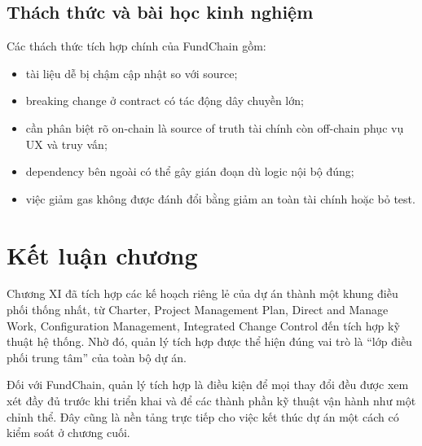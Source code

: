 \subsection{Thách thức và bài học kinh nghiệm}

Các thách thức tích hợp chính của FundChain gồm:

\begin{itemize}
  \item tài liệu dễ bị chậm cập nhật so với source;
  \item breaking change ở contract có tác động dây chuyền lớn;
  \item cần phân biệt rõ on-chain là source of truth tài chính còn off-chain phục vụ UX và truy vấn;
  \item dependency bên ngoài có thể gây gián đoạn dù logic nội bộ đúng;
  \item việc giảm gas không được đánh đổi bằng giảm an toàn tài chính hoặc bỏ test.
\end{itemize}

\fi
\section{Kết luận chương}

Chương XI đã tích hợp các kế hoạch riêng lẻ của dự án thành một khung điều phối thống nhất, từ Charter, Project Management Plan, Direct and Manage Work, Configuration Management, Integrated Change Control đến tích hợp kỹ thuật hệ thống. Nhờ đó, quản lý tích hợp được thể hiện đúng vai trò là ``lớp điều phối trung tâm'' của toàn bộ dự án.

Đối với FundChain, quản lý tích hợp là điều kiện để mọi thay đổi đều được xem xét đầy đủ trước khi triển khai và để các thành phần kỹ thuật vận hành như một chỉnh thể. Đây cũng là nền tảng trực tiếp cho việc kết thúc dự án một cách có kiểm soát ở chương cuối.
